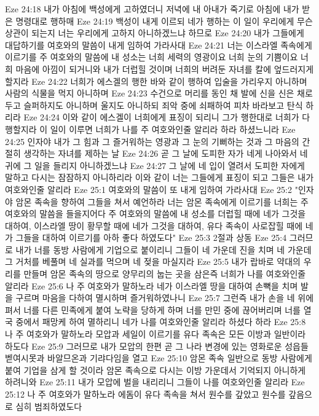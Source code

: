 Eze 24:18  내가 아침에 백성에게 고하였더니 저녁에 내 아내가 죽기로 아침에 내가 받은 명령대로 행하매
Eze 24:19  백성이 내게 이르되 네가 행하는 이 일이 우리에게 무슨 상관이 되는지 너는 우리에게 고하지 아니하겠느냐 하므로
Eze 24:20  내가 그들에게 대답하기를 여호와의 말씀이 내게 임하여 가라사대
Eze 24:21  너는 이스라엘 족속에게 이르기를 주 여호와의 말씀에 내 성소는 너희 세력의 영광이요 너희 눈의 기쁨이요 너희 마음에 아낌이 되거니와 내가 더럽힐 것이며 너희의 버려둔 자녀를 칼에 엎드러지게 할지라
Eze 24:22  너희가 에스겔의 행한 바와 같이 행하여 입술을 가리우지 아니하며 사람의 식물을 먹지 아니하며
Eze 24:23  수건으로 머리를 동인 채 발에 신을 신은 채로 두고 슬퍼하지도 아니하며 울지도 아니하되 죄악 중에 쇠패하여 피차 바라보고 탄식 하리라
Eze 24:24  이와 같이 에스겔이 너희에게 표징이 되리니 그가 행한대로 너희가 다 행할지라 이 일이 이루면 너희가 나를 주 여호와인줄 알리라 하라 하셨느니라
Eze 24:25  인자야 내가 그 힘과 그 즐거워하는 영광과 그 눈의 기뻐하는 것과 그 마음의 간절히 생각하는 자녀를 제하는 날
Eze 24:26  곧 그 날에 도피한 자가 네게 나아와서 네 귀에 그 일을 들리지 아니하겠느냐
Eze 24:27  그 날에 네 입이 열려서 도피한 자에게 말하고 다시는 잠잠하지 아니하리라 이와 같이 너는 그들에게 표징이 되고 그들은 내가 여호와인줄 알리라
Eze 25:1  여호와의 말씀이 또 내게 임하여 가라사대
Eze 25:2  "인자야 암몬 족속을 향하여 그들을 쳐서 예언하라 너는 암몬 족속에게 이르기를 너희는 주 여호와의 말씀을 들을지어다 주 여호와의 말씀에 내 성소를 더럽힐 때에 네가 그것을 대하여, 이스라엘 땅이 황무할 때에 네가 그것을 대하여, 유다 족속이 사로잡힐 때에 네가 그들을 대하여 이르기를 아하 좋다 하였도다"
Eze 25:3  2절과 상동
Eze 25:4  그러므로 내가 너를 동방 사람에게 기업으로 붙이리니 그들이 네 가운데 진을 치며 네 가운데 그 거처를 베풀며 네 실과를 먹으며 네 젖을 마실지라
Eze 25:5  내가 랍바로 약대의 우리를 만들며 암몬 족속의 땅으로 양무리의 눕는 곳을 삼은즉 너희가 나를 여호와인줄 알리라
Eze 25:6  나 주 여호와가 말하노라 네가 이스라엘 땅을 대하여 손뼉을 치며 발을 구르며 마음을 다하여 멸시하며 즐거워하였나니
Eze 25:7  그런즉 내가 손을 네 위에 펴서 너를 다른 민족에게 붙여 노략을 당하게 하며 너를 만민 중에 끊어버리며 너를 열국 중에서 패망케 하여 멸하리니 네가 나를 여호와인줄 알리라 하셨다 하라
Eze 25:8  나 주 여호와가 말하노라 모압과 세일이 이르기를 유다 족속은 모든 이방과 일반이라 하도다
Eze 25:9  그러므로 내가 모압의 한편 곧 그 나라 변경에 있는 영화로운 성읍들 벧여시못과 바알므온과 기랴다임을 열고
Eze 25:10  암몬 족속 일반으로 동방 사람에게 붙여 기업을 삼게 할 것이라 암몬 족속으로 다시는 이방 가운데서 기억되지 아니하게 하려니와
Eze 25:11  내가 모압에 벌을 내리리니 그들이 나를 여호와인줄 알리라
Eze 25:12  나 주 여호와가 말하노라 에돔이 유다 족속을 쳐서 원수를 갚았고 원수를 갚음으로 심히 범죄하였도다
